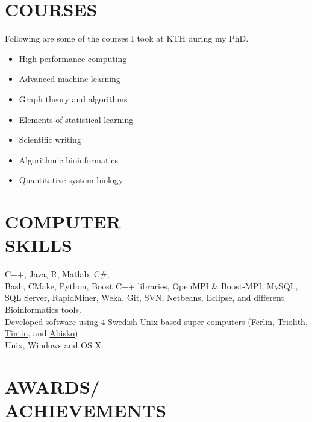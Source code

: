\documentclass[margin, 10pt]{res} %
\begin{document}
\begin{resume}
\section{COURSES}

Following are some of the courses I took at KTH during my PhD. 
\begin{itemize}
\item High performance computing
\item Advanced machine learning
\item Graph theory and algorithms
\item Elements of statistical learning
\item Scientific writing
\item Algorithmic bioinformatics
\item Quantitative system biology
\end{itemize} 


\section{COMPUTER \\ SKILLS} 

{\bf \color{Brown}{Languages:}} 
C++, Java, R, Matlab, C\#,  \\
{\bf \color{Brown}{Misc Tools:}} Bash, CMake, Python, Boost C++ libraries, OpenMPI \& Boost-MPI, MySQL, SQL Server, RapidMiner, Weka, Git, SVN, Netbeans, Eclipse, and different Bioinformatics tools. \\
{\bf \color{Brown}{HPC Clusters:}} Developed software using 4 Swedish Unix-based super computers (\href{https://www.pdc.kth.se/resources/computers/ferlin}{Ferlin}, \href{https://www.nsc.liu.se/systems/triolith/}{Triolith}, \href{http://www.uppmax.uu.se/}{Tintin}, and \href{http://www.hpc2n.umu.se/resources/abisko}{Abisko}) \\
{\bf \color{Brown}{Operating Systems:}} Unix, Windows and OS X.


\section{AWARDS/ \\ ACHIEVEMENTS} 


\end{resume}
\end{document}
